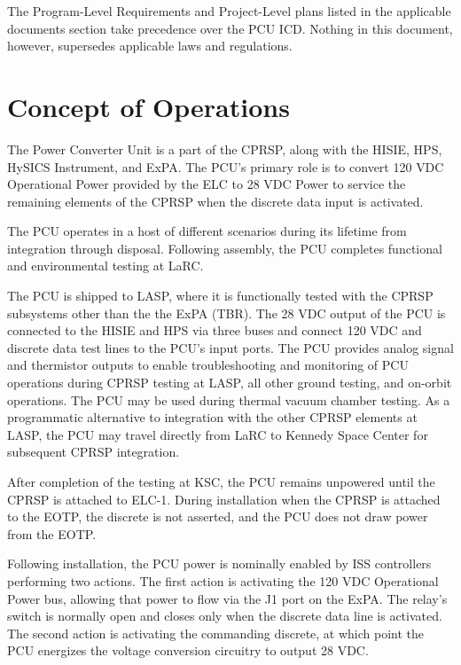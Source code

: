 \documentclass[12pt,oneside,oldfontcommands]{memoir}
\begin{document}
The Program-Level Requirements and Project-Level plans listed in the applicable documents section take precedence over the \gls{PCU} \gls{ICD}. Nothing in this document, however, supersedes applicable laws and regulations.

\chapter{Concept of Operations  }
\label{conops}

The Power Converter Unit is a part of the \gls{CPRSP}, along with the \gls{HISIE}, \gls{HPS}, \gls{HySICS} Instrument, and \gls{ExPA}. The \gls{PCU}'s primary role is to convert 120 \gls{VDC} Operational Power provided by the \gls{ELC} to 28 \gls{VDC} Power to service the remaining elements of the \gls{CPRSP} when the discrete data input is activated.

The \gls{PCU} operates in a host of different scenarios during its lifetime from integration through disposal. Following assembly, the \gls{PCU} completes functional and environmental testing at \gls{LaRC}.

The \gls{PCU} is shipped to \gls{LASP}, where it is functionally tested with the \gls{CPRSP} subsystems other than the the \gls{ExPA} (TBR\label{tbx_1}). The 28 \gls{VDC} output of the \gls{PCU} is connected to the \gls{HISIE} and \gls{HPS} via three buses and connect 120 \gls{VDC} and discrete data test lines to the \gls{PCU}'s input ports. The \gls{PCU} provides analog signal and thermistor outputs to enable troubleshooting and monitoring of \gls{PCU} operations during \gls{CPRSP} testing at \gls{LASP}, all other ground testing, and on-orbit operations. The \gls{PCU} may be used during thermal vacuum chamber testing. As a programmatic alternative to integration with the other \gls{CPRSP} elements at \gls{LASP}, the \gls{PCU} may travel directly from \gls{LaRC} to Kennedy Space Center for subsequent \gls{CPRSP} integration.

After completion of the testing at \gls{KSC}, the \gls{PCU} remains unpowered until the \gls{CPRSP} is attached to \gls{ELC}-1. During installation when the \gls{CPRSP} is attached to the \gls{EOTP}, the discrete is not asserted, and the \gls{PCU} does not draw power from the \gls{EOTP}.

Following installation, the \gls{PCU} power is nominally enabled by \gls{ISS} controllers performing two actions. The first action is activating the 120 \gls{VDC} Operational Power bus, allowing that power to flow via the J1 port on the \gls{ExPA}. The relay's switch is normally open and closes only when the discrete data line is activated. The second action is activating the commanding discrete, at which point the \gls{PCU} energizes the voltage conversion circuitry to output 28 \gls{VDC}.
\end{document}
